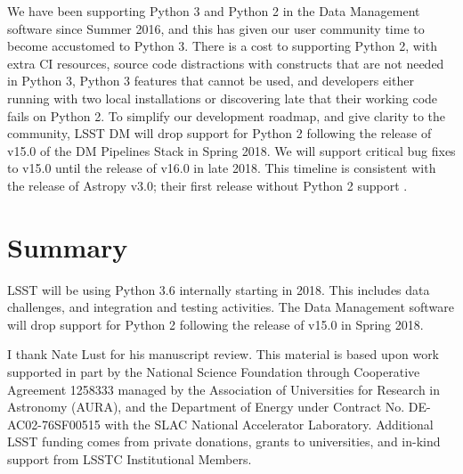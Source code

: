 \documentclass[11pt,twoside]{article}
\begin{document}
We have been supporting Python 3 and Python 2 in the Data Management software since Summer 2016, and this has given our user community time to become accustomed to Python 3.
There is a cost to supporting Python 2, with extra CI resources, source code distractions with constructs that are not needed in Python 3, Python 3 features that cannot be used, and developers either running with two local installations or discovering late that their working code fails on Python 2.
To simplify our development roadmap, and give clarity to the community, LSST DM will drop support for Python 2 following the release of v15.0 of the DM  Pipelines Stack in Spring 2018.
We will support critical bug fixes to v15.0 until the release of v16.0 in late 2018. This timeline is consistent with the release of Astropy v3.0; their first release without Python 2 support \citep{APE10}.

\section{Summary}

LSST will be using Python 3.6 internally starting in 2018.
This includes data challenges, and integration and testing activities.
The Data Management software will drop support for Python 2 following the release of v15.0 in Spring 2018.

\acknowledgements I thank Nate Lust for his manuscript review. This material is based upon work supported in part by the National Science Foundation through Cooperative Agreement 1258333 managed by the Association of Universities for Research in Astronomy (AURA), and the Department of Energy under Contract No. DE-AC02-76SF00515 with the SLAC National Accelerator Laboratory. Additional LSST funding comes from private donations, grants to universities, and in-kind support from LSSTC Institutional Members.

\end{document}
